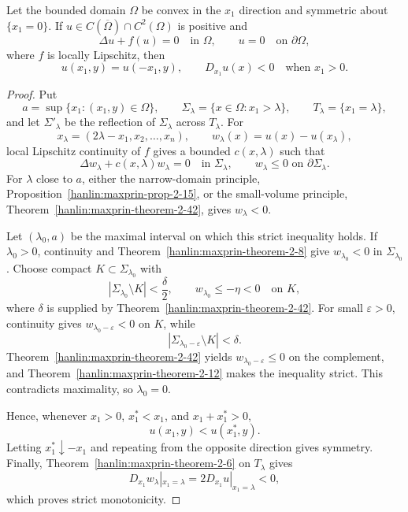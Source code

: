 \begin{lemma}\label{hanlin:maxprin-lemma-2-44}
Let the bounded domain $\Omega$ be convex in the $x_1$ direction and symmetric
about $\{x_1=0\}$. If $u\in C(\overline\Omega)\cap C^2(\Omega)$ is positive and
\[
\Delta u+f(u)=0\quad\text{in }\Omega,
\qquad
u=0\quad\text{on }\partial\Omega,
\]
where $f$ is locally Lipschitz, then
\[
u(x_1,y)=u(-x_1,y),
\qquad
D_{x_1}u(x)<0\quad\text{when }x_1>0.
\]
\end{lemma}
\begin{proof}
\sketch Put
\[
a=\sup\{x_1:(x_1,y)\in\Omega\},
\qquad
\Sigma_\lambda=\{x\in\Omega:x_1>\lambda\},
\qquad
T_\lambda=\{x_1=\lambda\},
\]
and let $\Sigma'_\lambda$ be the reflection of $\Sigma_\lambda$ across
$T_\lambda$. For
\[
x_\lambda=(2\lambda-x_1,x_2,\ldots,x_n),
\qquad
w_\lambda(x)=u(x)-u(x_\lambda),
\]
local Lipschitz continuity of $f$ gives a bounded $c(x,\lambda)$ such that
\[
\Delta w_\lambda+c(x,\lambda)w_\lambda=0
\quad\text{in }\Sigma_\lambda,
\qquad
w_\lambda\le0\text{ on }\partial\Sigma_\lambda.
\]
For $\lambda$ close to $a$, either the narrow-domain principle,
Proposition~\ref{hanlin:maxprin-prop-2-15}, or the small-volume principle,
Theorem~\ref{hanlin:maxprin-theorem-2-42}, gives $w_\lambda<0$.

Let $(\lambda_0,a)$ be the maximal interval on which this strict inequality
holds. If $\lambda_0>0$, continuity and
Theorem~\ref{hanlin:maxprin-theorem-2-8} give
$w_{\lambda_0}<0$ in $\Sigma_{\lambda_0}$. Choose compact
$K\subset\Sigma_{\lambda_0}$ with
\[
|\Sigma_{\lambda_0}\setminus K|<\frac\delta2,
\qquad
w_{\lambda_0}\le-\eta<0\quad\text{on }K,
\]
where $\delta$ is supplied by Theorem~\ref{hanlin:maxprin-theorem-2-42}.
For small $\varepsilon>0$, continuity gives
$w_{\lambda_0-\varepsilon}<0$ on $K$, while
\[
|\Sigma_{\lambda_0-\varepsilon}\setminus K|<\delta.
\]
Theorem~\ref{hanlin:maxprin-theorem-2-42} yields
$w_{\lambda_0-\varepsilon}\le0$ on the complement, and
Theorem~\ref{hanlin:maxprin-theorem-2-12} makes the inequality strict. This
contradicts maximality, so $\lambda_0=0$.

Hence, whenever $x_1>0$, $x_1^*<x_1$, and $x_1+x_1^*>0$,
\[
u(x_1,y)<u(x_1^*,y).
\]
Letting $x_1^*\downarrow-x_1$ and repeating from the opposite direction gives
symmetry. Finally, Theorem~\ref{hanlin:maxprin-theorem-2-6} on $T_\lambda$ gives
\[
D_{x_1}w_\lambda|_{x_1=\lambda}
=2D_{x_1}u|_{x_1=\lambda}<0,
\]
which proves strict monotonicity.
\end{proof}
